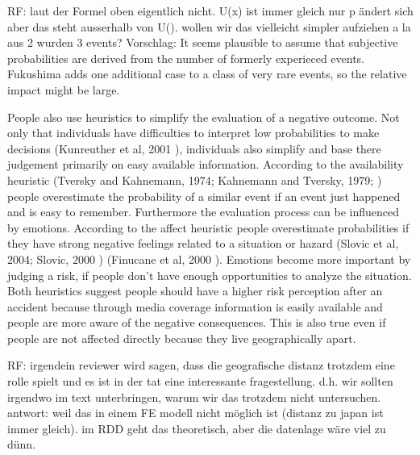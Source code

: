 RF: laut der Formel oben eigentlich nicht. U(x) ist immer gleich nur p ändert sich aber das steht ausserhalb von U(). wollen wir das vielleicht simpler aufziehen a la aus 2 wurden 3 events? Vorschlag:
It seems plausible to assume that subjective probabilities are derived from the number of formerly experieced events. Fukushima adds one additional case to a class of very rare events, so the relative impact might be large.

People also use heuristics to simplify the evaluation of a negative outcome. Not only that individuals have difficulties to interpret low probabilities to make decisions (Kunreuther et al, 2001 \citep{Kunreuther:2001dj}),   individuals also simplify and base there judgement primarily on easy available information. According to the availability heuristic  (Tversky and Kahnemann, 1974; Kahnemann and Tversky, 1979; \citep{Tversky:1974wi,Tversky:1973ui, kahnemann_prospect_1979}) people overestimate the probability of a similar event if an event just happened and is easy to remember. Furthermore the evaluation process can be influenced by emotions. According to the affect heuristic people overestimate probabilities if they have strong negative feelings related to a situation or hazard (Slovic et al, 2004; Slovic, 2000 \citep{Slovic:2004hj}\citep{Slovic:2000tx}) (Finucane et al, 2000 \citep{Finucane:2000wu}). Emotions become more important by judging a risk, if people don't have enough opportunities to analyze the situation. Both heuristics suggest people should have a higher risk perception after an accident because through media coverage information is easily available and people are more aware of the negative consequences. This is also true even if people are not affected directly because they live geographically apart.          

RF: irgendein reviewer wird sagen, dass die geografische distanz trotzdem eine rolle spielt und es ist in der tat eine interessante fragestellung. d.h. wir sollten irgendwo im text unterbringen, warum wir das trotzdem nicht untersuchen. antwort: weil das in einem FE modell nicht möglich ist (distanz zu japan ist immer gleich). im RDD geht das theoretisch, aber die datenlage wäre viel zu dünn.

